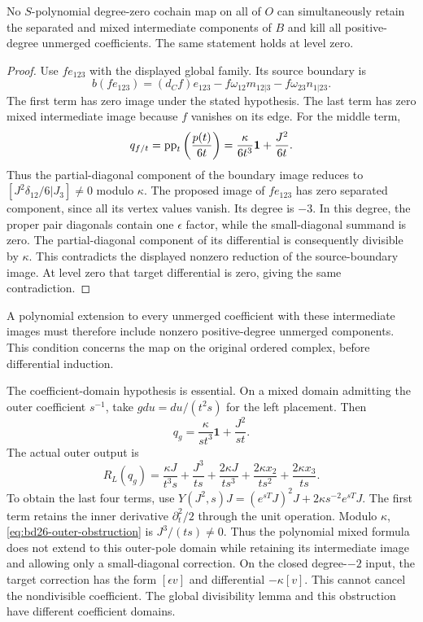 \begin{proposition}\label{prop:bd26-positive-form-obstruction}
No $S$-polynomial degree-zero cochain map on all of $O$ can simultaneously retain the separated and mixed intermediate components of $B$ and kill all positive-degree unmerged coefficients.
The same statement holds at level zero.
\end{proposition}
\begin{proof}
Use $fe_{123}$ with the displayed global family.
Its source boundary is
\[
 b(fe_{123})=(d_Cf)e_{123}
       -f\omega_{12}m_{12|3}-f\omega_{23}n_{1|23}.
\]
The first term has zero image under the stated hypothesis.
The last term has zero mixed intermediate image because $f$ vanishes on its edge.
For the middle term,
\[
 q_{f/t}=\operatorname{pp}_t\left(\frac{p(t)}{6t}\right)
 =\frac\kappa{6t^3}\mathbf1+\frac{J^2}{6t}.
\]
Thus the partial-diagonal component of the boundary image reduces to
$[J^2\delta_{12}/6|J_3]\ne0$ modulo $\kappa$.
The proposed image of $fe_{123}$ has zero separated component, since all its vertex values vanish.
Its degree is $-3$.
In this degree, the proper pair diagonals contain one $\epsilon$ factor, while the small-diagonal summand is zero.
The partial-diagonal component of its differential is consequently divisible by $\kappa$.
This contradicts the displayed nonzero reduction of the source-boundary image.
At level zero that target differential is zero, giving the same contradiction.
\end{proof}

A polynomial extension to every unmerged coefficient with these intermediate images must therefore include nonzero positive-degree unmerged components.
This condition concerns the map on the original ordered complex, before differential induction.

The coefficient-domain hypothesis is essential.
On a mixed domain admitting the outer coefficient $s^{-1}$, take
$gdu=du/(t^2s)$ for the left placement.
Then
\[
 q_g=\frac\kappa{st^3}\mathbf1+\frac{J^2}{st}.
\]
The actual outer output is
\begin{equation}\label{eq:bd26-outer-obstruction}
 R_L(q_g)=
 \frac{\kappa J}{t^3s}+\frac{J^3}{ts}
 +\frac{2\kappa J}{ts^3}
 +\frac{2\kappa x_2}{ts^2}
 +\frac{2\kappa x_3}{ts}.
\end{equation}
To obtain the last four terms, use
$Y(J^2,s)J=(e^{sT}J)^2J+2\kappa s^{-2}e^{sT}J$.
The first term retains the inner derivative $\partial_t^2/2$ through the unit operation.
Modulo $\kappa$, \eqref{eq:bd26-outer-obstruction} is $J^3/(ts)\ne0$.
Thus the polynomial mixed formula does not extend to this outer-pole domain while retaining its intermediate image and allowing only a small-diagonal correction.
On the closed degree-$-2$ input, the target correction has the form $[\epsilon v]$ and differential $-\kappa[v]$.
This cannot cancel the nondivisible coefficient.
The global divisibility lemma and this obstruction have different coefficient domains.

